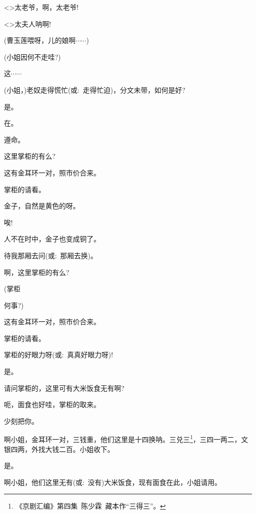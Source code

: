 {{\textless{}\!\textgreater{}太老爷，啊，太老爷!}


{ }

{\textless{}\!\textgreater{}太夫人{\footnotesize 呐}啊!}

{(曹玉莲\hspace{20pt}喂呀，儿的娘啊$\cdots{}\cdots{}$)}


{(小姐因何不走哇?)}

{这$\cdots{}\cdots{}$}

{(小姐，)老奴走得慌忙({\akai 或}:~走得忙迫)，分文未带，如何是好?}

{是。}

{在。}

{遵命。}

{这里掌柜的有么?}

{这有金耳环一对，照市价合来。}

{掌柜的请看。}

{金子，自然是黄色的呀。}

{唉!

人不在时中，金子也变成铜了。}

{待我那厢去问({\akai 或}:~那厢去换)。}

{啊，这里掌柜的有么?}

{(掌柜

何事?)}

{这有金耳环一对，照市价合来。}

{掌柜的请看。}

{掌柜的好眼力呀({\akai 或}:~真真好眼力呀)!}

{是。}

{请问掌柜的，这里可有大米饭食无有{\footnotesize 啊}?}

{呃，面食也好哇，掌柜的取来。}

{少刻把你。}

{啊小姐，金耳环一对，三钱重，他们这里是十四换呐。三兑三}\footnote{《京剧汇编》第四集~陈少霖~藏本作``三得三''。}{，三四一两二，文银四两，外找大钱二百。小姐收下。}

{是。}

{啊小姐，他们这里无有({\akai 或}:~没有)大米饭食，现有面食在此，小姐请用。}

}
